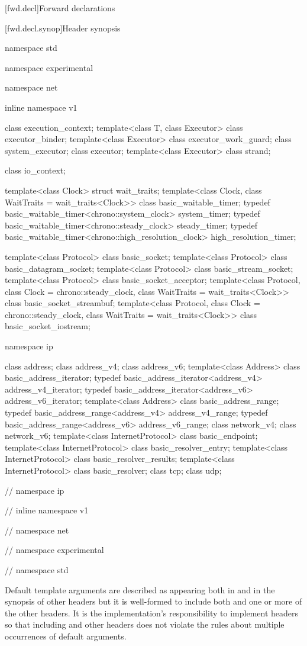 
[fwd.decl]{Forward declarations}


%
[fwd.decl.synop]{Header  synopsis}

\begin{codeblock}
namespace std {
namespace experimental {
namespace net {
inline namespace v1 {

  class execution_context;
  template<class T, class Executor>
    class executor_binder;
  template<class Executor>
    class executor_work_guard;
  class system_executor;
  class executor;
  template<class Executor>
    class strand;

  class io_context;

  template<class Clock> struct wait_traits;
  template<class Clock, class WaitTraits = wait_traits<Clock>>
    class basic_waitable_timer;
  typedef basic_waitable_timer<chrono::system_clock> system_timer;
  typedef basic_waitable_timer<chrono::steady_clock> steady_timer;
  typedef basic_waitable_timer<chrono::high_resolution_clock> high_resolution_timer;

  template<class Protocol>
    class basic_socket;
  template<class Protocol>
    class basic_datagram_socket;
  template<class Protocol>
    class basic_stream_socket;
  template<class Protocol>
    class basic_socket_acceptor;
  template<class Protocol, class Clock = chrono::steady_clock,
    class WaitTraits = wait_traits<Clock>>
      class basic_socket_streambuf;
  template<class Protocol, class Clock = chrono::steady_clock,
    class WaitTraits = wait_traits<Clock>>
      class basic_socket_iostream;

  namespace ip {

    class address;
    class address_v4;
    class address_v6;
    template<class Address>
      class basic_address_iterator;
    typedef basic_address_iterator<address_v4> address_v4_iterator;
    typedef basic_address_iterator<address_v6> address_v6_iterator;
    template<class Address>
      class basic_address_range;
    typedef basic_address_range<address_v4> address_v4_range;
    typedef basic_address_range<address_v6> address_v6_range;
    class network_v4;
    class network_v6;
    template<class InternetProtocol>
      class basic_endpoint;
    template<class InternetProtocol>
      class basic_resolver_entry;
    template<class InternetProtocol>
      class basic_resolver_results;
    template<class InternetProtocol>
      class basic_resolver;
    class tcp;
    class udp;

  } // namespace ip
} // inline namespace v1
} // namespace net
} // namespace experimental
} // namespace std
\end{codeblock}

\pnum
Default template arguments are described as appearing both in 
and in the synopsis of other headers but it is well-formed to include both
 and one or more of the other headers.
\enternote It is the implementation's responsibility to implement headers so
that including  and other headers does not violate the rules
about multiple occurrences of default arguments. \exitnote



